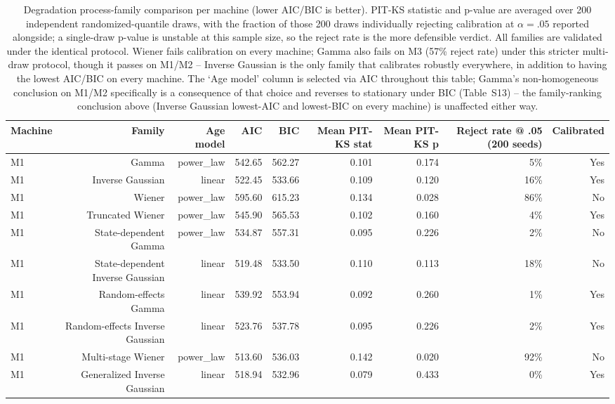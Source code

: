 \begin{table}[t]
\centering
\caption{Degradation process-family comparison per machine (lower AIC/BIC is better). PIT-KS statistic and p-value are averaged over 200 independent randomized-quantile draws, with the fraction of those 200 draws individually rejecting calibration at $\alpha=.05$ reported alongside; a single-draw p-value is unstable at this sample size, so the reject rate is the more defensible verdict. All families are validated under the identical protocol. Wiener fails calibration on every machine; Gamma also fails on M3 (57\% reject rate) under this stricter multi-draw protocol, though it passes on M1/M2 -- Inverse Gaussian is the only family that calibrates robustly everywhere, in addition to having the lowest AIC/BIC on every machine. The `Age model' column is selected via AIC throughout this table; Gamma's non-homogeneous conclusion on M1/M2 specifically is a consequence of that choice and reverses to stationary under BIC (Table~S13) -- the family-ranking conclusion above (Inverse Gaussian lowest-AIC and lowest-BIC on every machine) is unaffected either way.}
\label{tab:degradation-comparison}
\begin{tabular}{lrrrrrrrr}
\toprule
Machine & Family & Age model & AIC & BIC & Mean PIT-KS stat & Mean PIT-KS p & Reject rate @ .05 (200 seeds) & Calibrated \\
\midrule
M1 & Gamma & power\_law & 542.65 & 562.27 & 0.101 & 0.174 & 5\% & Yes \\
M1 & Inverse Gaussian & linear & 522.45 & 533.66 & 0.109 & 0.120 & 16\% & Yes \\
M1 & Wiener & power\_law & 595.60 & 615.23 & 0.134 & 0.028 & 86\% & No \\
M1 & Truncated Wiener & power\_law & 545.90 & 565.53 & 0.102 & 0.160 & 4\% & Yes \\
M1 & State-dependent Gamma & power\_law & 534.87 & 557.31 & 0.095 & 0.226 & 2\% & No \\
M1 & State-dependent Inverse Gaussian & linear & 519.48 & 533.50 & 0.110 & 0.113 & 18\% & No \\
M1 & Random-effects Gamma & linear & 539.92 & 553.94 & 0.092 & 0.260 & 1\% & Yes \\
M1 & Random-effects Inverse Gaussian & linear & 523.76 & 537.78 & 0.095 & 0.226 & 2\% & Yes \\
M1 & Multi-stage Wiener & power\_law & 513.60 & 536.03 & 0.142 & 0.020 & 92\% & No \\
M1 & Generalized Inverse Gaussian & linear & 518.94 & 532.96 & 0.079 & 0.433 & 0\% & Yes \\

\end{tabular}
\end{table}
